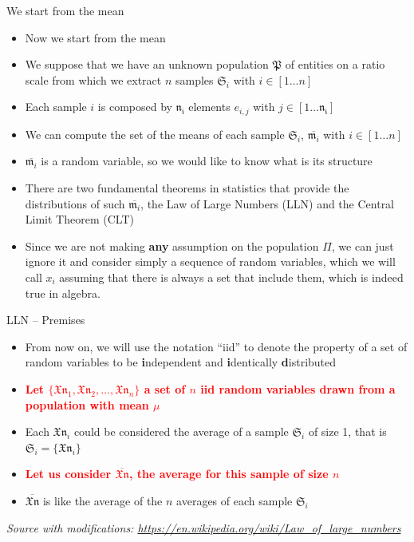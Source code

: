 \documentclass{beamer}
\begin{document}
\begin{frame}
{\centerline{We start from the mean}}

\begin{itemize}
\item Now we start from the mean
\item We suppose that we have an unknown population $\mathfrak{P}$ of entities on a ratio scale from which we extract $n$ samples $\mathfrak{S}_i$ with $i \in [1 \ldots{} n]$
\item Each sample $i$ is composed by $\mathfrak{n_i}$ elements $e_{i,j}$ with $j \in [1\ldots{}\mathfrak{n_i}]$
\item We can compute the set of the means of each sample $\mathfrak{S}_i$, $\overline {\mathfrak{m}_i}$ with $i \in [1 \ldots{} n]$
\item $\overline{\mathfrak{m}_i}$ is a random variable, so we would like to know what is its structure
\item There are two fundamental theorems in statistics that provide the distributions of such  $\overline{\mathfrak{m}_i}$, the Law of Large Numbers (LLN) and the Central Limit Theorem (CLT)
\item Since we are not making \textbf{any} assumption on the population  $\Pi$, we can just ignore it and consider simply a sequence of random variables, which we will call $x_i$ assuming that there is always a set that include them, which is indeed true in algebra.

\end{itemize}


\end{frame}

\begin{frame}
{\centerline{LLN -- Premises}}

\begin{itemize}
\item From now on, we will use the notation ``iid'' to denote the property of a set of random variables to be \textbf{ i}ndependent and \textbf{ i}dentically \textbf{ d}istributed
\item \textcolor{red}{ \bf Let $\{ \mathfrak{Xn}_1, \mathfrak{Xn}_2, \ldots{}, \mathfrak{Xn}_n\}$ a set of $n$ iid random variables drawn from a population with mean $\mu$}
\item Each $\mathfrak{Xn}_i$ could be considered the average of a sample $\mathfrak{S}_i$ of size 1, that is $\mathfrak{S}_i = \{ \mathfrak{Xn}_i \}$
\item \textcolor{red}{ \bf Let us consider $\overline{\mathfrak{Xn}}$, the average for this sample of size $n$ }
\item $\overline{\mathfrak{Xn}}$ is like the average of the $n$ averages of each sample $\mathfrak{S}_i$
\end{itemize}

\textit{\small
Source with modifications: \url{https://en.wikipedia.org/wiki/Law_of_large_numbers}}
\end{frame}
\end{document}
